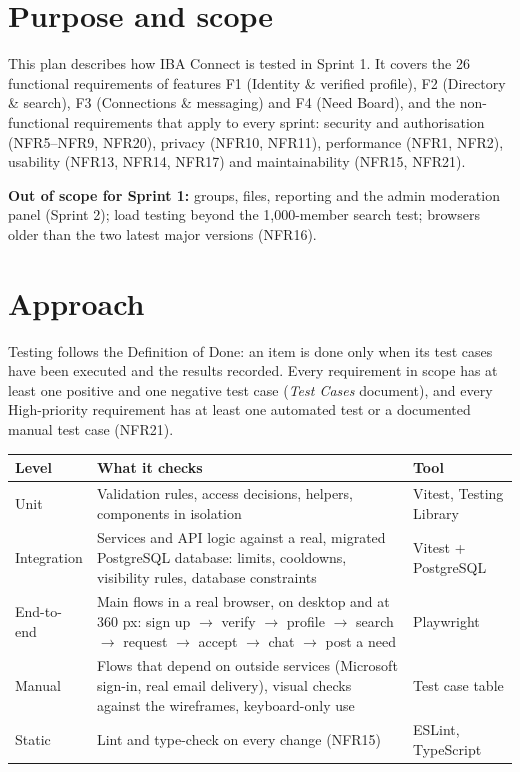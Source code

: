 \documentclass[10pt,a4paper]{article}
\begin{document}
\makedoctitle

\section{Purpose and scope}
This plan describes how IBA Connect is tested in Sprint 1. It covers the 26 functional requirements of features F1 (Identity \& verified profile), F2 (Directory \& search), F3 (Connections \& messaging) and F4 (Need Board), and the non-functional requirements that apply to every sprint: security and authorisation (NFR5--NFR9, NFR20), privacy (NFR10, NFR11), performance (NFR1, NFR2), usability (NFR13, NFR14, NFR17) and maintainability (NFR15, NFR21).

\textbf{Out of scope for Sprint 1:} groups, files, reporting and the admin moderation panel (Sprint 2); load testing beyond the 1,000-member search test; browsers older than the two latest major versions (NFR16).

\section{Approach}
Testing follows the Definition of Done: an item is done only when its test cases have been executed and the results recorded. Every requirement in scope has at least one positive and one negative test case (\emph{Test Cases} document), and every High-priority requirement has at least one automated test or a documented manual test case (NFR21).

\begin{tabularx}{\linewidth}{@{}l X l@{}}
\toprule
\textbf{Level} & \textbf{What it checks} & \textbf{Tool}\\
\midrule
Unit & Validation rules, access decisions, helpers, components in isolation & Vitest, Testing Library\\
Integration & Services and API logic against a real, migrated PostgreSQL database: limits, cooldowns, visibility rules, database constraints & Vitest + PostgreSQL\\
End-to-end & Main flows in a real browser, on desktop and at 360 px: sign up $\rightarrow$ verify $\rightarrow$ profile $\rightarrow$ search $\rightarrow$ request $\rightarrow$ accept $\rightarrow$ chat $\rightarrow$ post a need & Playwright\\
Manual & Flows that depend on outside services (Microsoft sign-in, real email delivery), visual checks against the wireframes, keyboard-only use & Test case table\\
Static & Lint and type-check on every change (NFR15) & ESLint, TypeScript\\
\bottomrule
\end{tabularx}
\end{document}
